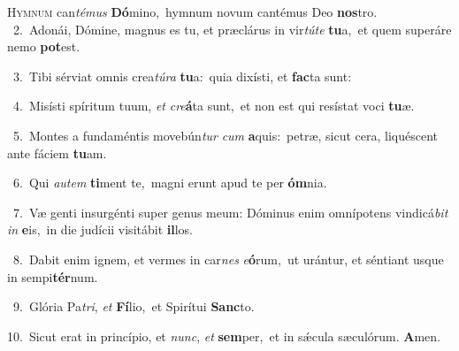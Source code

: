 \lettrine{\initial\textcolor{\initialcolor}{H}}{ymnum} can\-\textit{té}\-\textit{mus} \textbf{Dó}\-mino,~\star hymnum novum cantémus Deo \textbf{nos}\-tro.\\
{\numbfont\textcolor{\numbcolor}{~2.}}~Adonái, Dómine, magnus es tu, et præclárus in vir\-\textit{tú}\-\textit{te} \textbf{tu}\-a,~\star et quem superáre nemo \textbf{pot}\-est.\par
{\numbfont\textcolor{\numbcolor}{~3.}}~Tibi sérviat omnis crea\-\textit{tú}\-\textit{ra} \textbf{tu}\-a:~\star quia dixísti, et \textbf{fac}\-ta sunt:\par
{\numbfont\textcolor{\numbcolor}{~4.}}~Misísti spíritum tuum, \textit{et} \textit{cre}\-\textbf{á}ta sunt,~\star et non est qui resístat voci \textbf{tu}\-æ.\par
{\numbfont\textcolor{\numbcolor}{~5.}}~Montes a fundaméntis movebún\textit{tur} \textit{cum} \textbf{a}\-quis:~\star petræ, sicut cera, liquéscent ante fáciem \textbf{tu}\-am.\par
{\numbfont\textcolor{\numbcolor}{~6.}}~Qui \textit{au}\-\textit{tem} \textbf{ti}\-ment te,~\star magni erunt apud te per \textbf{óm}\-nia.\par
{\numbfont\textcolor{\numbcolor}{~7.}}~Væ genti insurgénti super genus meum: Dóminus enim omnípotens vindicá\textit{bit} \textit{in} \textbf{e}\-is,~\star in die judícii visitábit \textbf{il}\-los.\par
{\numbfont\textcolor{\numbcolor}{~8.}}~Dabit enim ignem, et vermes in car\textit{nes} \textit{e}\-\textbf{ó}rum,~\star ut urántur, et séntiant usque in sempi\-\textbf{tér}\-num.\par
{\numbfont\textcolor{\numbcolor}{~9.}}~Glória Pa\-\textit{tri}\-, \textit{et} \textbf{Fí}\-lio,~\star et Spirítui \textbf{Sanc}\-to.\par
{\numbfont\textcolor{\numbcolor}{10.}}~Sicut erat in princípio, et \textit{nunc}\-, \textit{et} \textbf{sem}\-per,~\star et in sǽcula sæculórum. \textbf{A}\-men.\par
